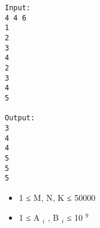 \begin{verbatim}
Input:
4 4 6
1
2
3
4
2
3
4
5

Output:
3
4
4
5
5
5
\end{verbatim}
\begin{itemize}
	\item     1 ≤ M, N, K ≤ 50000   
	\item     1 ≤ A    $_     i    $    , B    $_     i    $    ≤ 10    $^     9    $
\end{itemize}